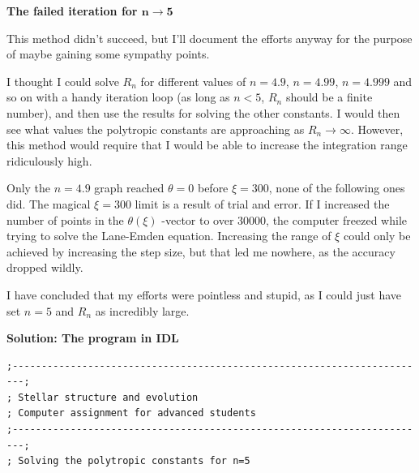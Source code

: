 \documentclass[a4paper,12pt]{article}
\begin{document}
\begin{itemize}
\newpage

\textbf{The failed iteration for $\mathbf{n \to 5}$}



This method didn't succeed, but I'll document the efforts anyway for the purpose of maybe gaining some sympathy points.

I thought I could solve $R_n$ for different values of $n=4.9$, $n=4.99$, $n=4.999$ and so on with a handy iteration loop (as long as $n<5$, $R_n$ should be a finite number), and then use the results for solving the other constants. I would then see what values the polytropic constants are approaching as $R_n \to \infty $. However, this method would require that I would be able to increase the integration range ridiculously high. 

Only the $n=4.9$ graph reached $\theta=0$ before $\xi=300$, none of the following ones did. The magical $\xi=300$ limit is a result of trial and error. If I increased the number of points in the $\theta(\xi)$ -vector to over 30000, the computer freezed while trying to solve the Lane-Emden equation. Increasing the range of $\xi$ could only be achieved by increasing the step size, but that led me nowhere, as the accuracy dropped wildly.

I have concluded that my efforts were pointless and stupid, as I could just have set $n=5$ and $R_n$ as incredibly large.

\vspace{0.5cm}
\textbf{Solution: The program in IDL}

\begin{scriptsize}
\begin{verbatim}
;------------------------------------------------------------------------;
; Stellar structure and evolution
; Computer assignment for advanced students
;------------------------------------------------------------------------;
; Solving the polytropic constants for n=5


\end{verbatim}
\end{scriptsize}
\end{itemize}
\end{document}
